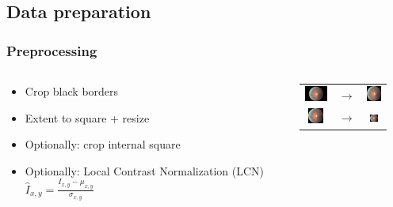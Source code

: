 \documentclass{beamer}
\begin{document}
\subsection{Data preparation}


\begin{frame}\frametitle{Preprocessing}
\begin{columns}

\begin{column}{9cm}
\begin{itemize}
\item Crop black borders
\vspace{20pt}

\item Extent to square + resize
\vspace{20pt}

\item Optionally: crop internal square
\vspace{20pt}

\item Optionally: Local Contrast Normalization (LCN) \\ 
      $ \hat{I}_{x,y} = \frac{I_{x,y} - \mu_{x,y}}{\sigma_{x,y}} $
\end{itemize}
\end{column}

\begin{column}{6cm}
\begin{tabular}{ @{}c m{0.25cm} c }

	\includegraphics[valign=c,height=0.5cm]{pics/10_left.jpeg} & $\rightarrow$ &
    \includegraphics[valign=c,height=0.5cm]{pics/10_left.png}
    \vspace{10pt} \\ 
    
	\includegraphics[valign=c,height=0.5cm]{pics/10_left.png} & $\rightarrow$ &
    \includegraphics[valign=c,height=0.25cm]{pics/10_left.png}
	\vspace{10pt} \\ 	


\end{tabular}
\end{column}
\end{columns}
\end{frame}
\end{document}
